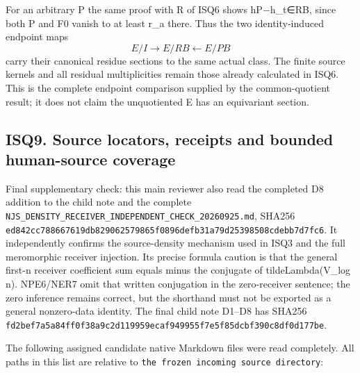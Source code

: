 \documentclass[
]{article}
\begin{document}
For an arbitrary P the same proof with R of ISQ6 shows hP−h\_t∈RB, since both P and F0 vanish to at least r\_a there. Thus the two identity-induced endpoint maps \[
E/I\longrightarrow E/RB\longleftarrow E/PB
\tag{ISQ8.3}
\] carry their canonical residue sections to the same actual class. The finite source kernels and all residual multiplicities remain those already calculated in ISQ6. This is the complete endpoint comparison supplied by the common-quotient result; it does not claim the unquotiented E has an equivariant section.

\subsection{ISQ9. Source locators, receipts and bounded human-source coverage}\label{isq9.-source-locators-receipts-and-bounded-human-source-coverage}

Final supplementary check: this main reviewer also read the completed D8 addition to the child note and the complete \texttt{NJS\_DENSITY\_RECEIVER\_INDEPENDENT\_CHECK\_20260925.md}, SHA256 \texttt{ed842cc788667619db829062579865f0896defb31a79d25398508cdebb7d7fc6}. It independently confirms the source-density mechanism used in ISQ3 and the full meromorphic receiver injection. Its precise formula caution is that the general first-n receiver coefficient sum equals minus the conjugate of tildeLambda(V\_log n). NPE6/NER7 omit that written conjugation in the zero-receiver sentence; the zero inference remains correct, but the shorthand must not be exported as a general nonzero-data identity. The final child note D1--D8 has SHA256 \texttt{fd2bef7a5a84ff0f38a9c2d119959ecaf949955f7e5f85dcbf390c8df0d177be}.

The following assigned candidate native Markdown files were read completely. All paths in this list are relative to \texttt{the\ frozen\ incoming\ source\ directory}:
\end{document}
